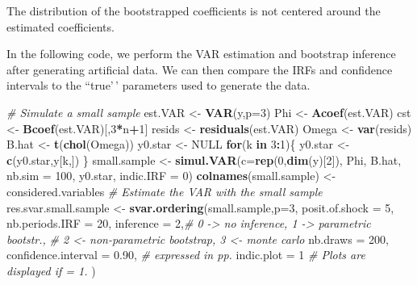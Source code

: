 \documentclass[
  11pt,
]{book}
\newenvironment{Shaded}{\begin{snugshade}}{\end{snugshade}}
\newcommand{\AttributeTok}[1]{\textcolor[rgb]{0.13,0.29,0.53}{#1}}
\newcommand{\CommentTok}[1]{\textcolor[rgb]{0.56,0.35,0.01}{\textit{#1}}}
\newcommand{\ConstantTok}[1]{\textcolor[rgb]{0.56,0.35,0.01}{#1}}
\newcommand{\ControlFlowTok}[1]{\textcolor[rgb]{0.13,0.29,0.53}{\textbf{#1}}}
\newcommand{\DecValTok}[1]{\textcolor[rgb]{0.00,0.00,0.81}{#1}}
\newcommand{\FloatTok}[1]{\textcolor[rgb]{0.00,0.00,0.81}{#1}}
\newcommand{\FunctionTok}[1]{\textcolor[rgb]{0.13,0.29,0.53}{\textbf{#1}}}
\newcommand{\NormalTok}[1]{#1}
\newcommand{\OtherTok}[1]{\textcolor[rgb]{0.56,0.35,0.01}{#1}}
\newcommand{\SpecialCharTok}[1]{\textcolor[rgb]{0.81,0.36,0.00}{\textbf{#1}}}
\theoremstyle{definition}
\theoremstyle{definition}
\theoremstyle{definition}
\theoremstyle{definition}
\theoremstyle{remark}
\begin{document}
The distribution of the bootstrapped coefficients is not centered around the estimated coefficients.

In the following code, we perform the VAR estimation and bootstrap inference after generating artificial data. We can then compare the IRFs and confidence intervals to the ``true'\,' parameters used to generate the data.

\begin{Shaded}
\begin{Highlighting}[]
\CommentTok{\# Simulate a small sample}
\NormalTok{est.VAR }\OtherTok{\textless{}{-}} \FunctionTok{VAR}\NormalTok{(y,}\AttributeTok{p=}\DecValTok{3}\NormalTok{)}
\NormalTok{Phi     }\OtherTok{\textless{}{-}} \FunctionTok{Acoef}\NormalTok{(est.VAR)}
\NormalTok{cst     }\OtherTok{\textless{}{-}} \FunctionTok{Bcoef}\NormalTok{(est.VAR)[,}\DecValTok{3}\SpecialCharTok{*}\NormalTok{n}\SpecialCharTok{+}\DecValTok{1}\NormalTok{]}
\NormalTok{resids  }\OtherTok{\textless{}{-}} \FunctionTok{residuals}\NormalTok{(est.VAR)}
\NormalTok{Omega   }\OtherTok{\textless{}{-}} \FunctionTok{var}\NormalTok{(resids)}
\NormalTok{B.hat   }\OtherTok{\textless{}{-}} \FunctionTok{t}\NormalTok{(}\FunctionTok{chol}\NormalTok{(Omega))}
\NormalTok{y0.star }\OtherTok{\textless{}{-}} \ConstantTok{NULL}
\ControlFlowTok{for}\NormalTok{(k }\ControlFlowTok{in} \DecValTok{3}\SpecialCharTok{:}\DecValTok{1}\NormalTok{)\{}
\NormalTok{  y0.star }\OtherTok{\textless{}{-}} \FunctionTok{c}\NormalTok{(y0.star,y[k,])}
\NormalTok{\}}
\NormalTok{small.sample }\OtherTok{\textless{}{-}} \FunctionTok{simul.VAR}\NormalTok{(}\AttributeTok{c=}\FunctionTok{rep}\NormalTok{(}\DecValTok{0}\NormalTok{,}\FunctionTok{dim}\NormalTok{(y)[}\DecValTok{2}\NormalTok{]),}
\NormalTok{                          Phi,}
\NormalTok{                          B.hat,}
                          \AttributeTok{nb.sim =} \DecValTok{100}\NormalTok{,}
\NormalTok{                          y0.star,}
                          \AttributeTok{indic.IRF =} \DecValTok{0}\NormalTok{)}
\FunctionTok{colnames}\NormalTok{(small.sample)  }\OtherTok{\textless{}{-}}\NormalTok{ considered.variables}
\CommentTok{\# Estimate the VAR with the small sample}
\NormalTok{res.svar.small.sample }\OtherTok{\textless{}{-}}
  \FunctionTok{svar.ordering}\NormalTok{(small.sample,}\AttributeTok{p=}\DecValTok{3}\NormalTok{,}
                \AttributeTok{posit.of.shock =} \DecValTok{5}\NormalTok{,}
                \AttributeTok{nb.periods.IRF =} \DecValTok{20}\NormalTok{,}
                \AttributeTok{inference =} \DecValTok{2}\NormalTok{,}\CommentTok{\# 0 {-}\textgreater{} no inference, 1 {-}\textgreater{} parametric bootstr.,}
                \CommentTok{\# 2 \textless{}{-} non{-}parametric bootstrap, 3 \textless{}{-} monte carlo}
                \AttributeTok{nb.draws =} \DecValTok{200}\NormalTok{,}
                \AttributeTok{confidence.interval =} \FloatTok{0.90}\NormalTok{, }\CommentTok{\# expressed in pp.}
                \AttributeTok{indic.plot =} \DecValTok{1} \CommentTok{\# Plots are displayed if = 1.}
\NormalTok{  )}
\end{Highlighting}
\end{Shaded}
\end{document}
